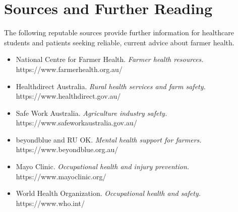 \section*{Sources and Further Reading}
The following reputable sources provide further information for healthcare students and patients seeking reliable, current advice about farmer health.
\begin{itemize}
    \item National Centre for Farmer Health. \textit{Farmer health resources.} https://www.farmerhealth.org.au/
    \item Healthdirect Australia. \textit{Rural health services and farm safety.} https://www.healthdirect.gov.au/
    \item Safe Work Australia. \textit{Agriculture industry safety.} https://www.safeworkaustralia.gov.au/
    \item beyondblue and RU OK. \textit{Mental health support for farmers.} https://www.beyondblue.org.au/
    \item Mayo Clinic. \textit{Occupational health and injury prevention.} https://www.mayoclinic.org/
    \item World Health Organization. \textit{Occupational health and safety.} https://www.who.int/
\end{itemize}
